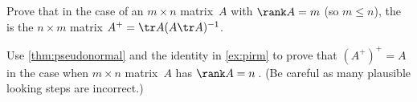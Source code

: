\begin{exercise} \label{ex:pirm} 
Prove that in the case of an \(m\times n\) matrix~\(A\) with \(\rank A=m\) (so \(m\leq n\)), the  is the \(n\times m\) matrix \(A^+=\tr A(A\tr A)^{-1}\).
\end{exercise}





\begin{exercise} \label{ex:} 
Use \autoref{thm:pseudonormal} and the identity in \autoref{ex:pirm} to prove that \((A^+)^+=A\) in the case when \(m\times n\) matrix~\(A\) has \(\rank A=n\)\,.
(Be careful as many plausible looking steps are incorrect.)
\end{exercise}




\begin{comment}
More exercises of pseudo-inverse could prove conditionally \((cA)^+=(1/c)A^+\), \((A^+)^+=A\), \((\tr A)^+=\tr{(A^+)}\).
More exercises on function composition.
\end{comment}






